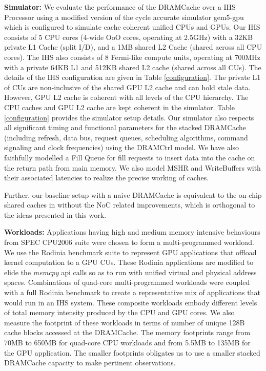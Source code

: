 \par \textbf{Simulator:} We evaluate the performance of the DRAMCache over a IHS Processor using a modified version of the cycle accurate simulator gem5-gpu \cite{gem5-gpu} which is configured to simulate cache coherent unified CPUs and GPUs. 
Our IHS consists of 5 CPU cores (4-wide OoO cores, operating at 2.5GHz) with a 32KB private L1 Cache (split I/D), and a 1MB shared L2 Cache (shared across all CPU cores). The IHS also consists of 8 Fermi-like compute units, operating at 700MHz with a private 64KB L1 and 512KB shared L2 cache (shared across all CUs). The details of the IHS configuration are given in Table \ref{configuration}. The private L1 of CUs are non-inclusive of the shared GPU L2 cache and can hold stale data. However, GPU L2 cache is coherent with all levels of the CPU hierarchy. The CPU caches and GPU L2 cache are kept coherent in the simulator. Table \ref{configuration} provides the simulator setup details. 
Our simulator also respects all significant timing and functional parameters for the stacked DRAMCache (including refresh, data bus, request queues, scheduling algorithms, command signaling and clock frequencies) using the DRAMCtrl \cite{dramctrl} model. We have also faithfully modelled  a Fill Queue \cite{dca} for fill requests to insert data into the cache on the return path from main memory. We also model MSHR and WriteBuffers with their associated latencies to realize the precise working of caches. 
\par Further, our baseline setup with a naive DRAMCache is equivalent to the on-chip shared caches in \cite{oscar} without the NoC related improvements, which is orthogonal to the ideas presented in this work.

\par \textbf{Workloads:} Applications having high and medium memory intensive behaviours from SPEC CPU2006 suite \cite{spec2006} were chosen to form a multi-programmed workload. We use the Rodinia benchmark suite \cite{rodinia} to represent GPU applications that offload kernel computation to a GPU CUs. These Rodinia applications are modified to elide the \textit{memcpy} api calls so as to run with unified virtual and physical address spaces. Combinations of quad-core multi-programmed workloads were coupled with a full Rodinia benchmark to create a representative mix of applications that would run in an IHS system. These composite workloads embody different levels of total memory intensity produced by the CPU and GPU cores. We also measure the footprint of these workloads in terms of number of unique 128B cache blocks accessed at the DRAMCache. The memory footprints range from 70MB to 650MB for quad-core CPU workloads and from 5.5MB to 135MB for the GPU application. The smaller footprints obligates us to use a smaller stacked DRAMCache capacity to make pertinent observations.


